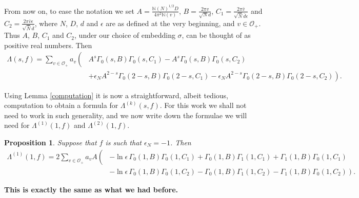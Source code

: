 \documentclass{article}
\theoremstyle{plain}
\newtheorem{proposition}{Proposition}
\begin{document}
From now on, to ease the notation we set $A=\frac{\mathbb{N}(N)^{1/2}D}{4\pi^2\mathbb{N}(v)}$, $B=\frac{2\pi v }{\sqrt{N}d}$, $C_1=\frac{2 \pi \bar{v}}{\sqrt{\bar{N}}\bar{d} \epsilon}$ and $C_2=\frac{2 \pi \bar{v}\epsilon}{\sqrt{\bar{N}}\bar{d} }$, where $N$, $D$, $d$ and $\epsilon$ are as defined at the very beginning, and $v \in \mathcal{O}_+$. Thus $A$, $B$, $C_1$ and $C_2$, under our choice of embedding $\sigma$, can be thought of as positive real numbers.
Then
\begin{equation}\label{simpleLambda}
\begin{split}
\Lambda(s,f)= \sum_{v \in \mathcal{O}_+} a_v \left( \right. &A^s \Gamma_0(s, B)\Gamma_0(s,C_1)  - A^s\Gamma_0(s,B)\Gamma_0(s,C_2)  \\
&+\left. \epsilon_N A^{2-s}\Gamma_0(2-s,B)\Gamma_0(2-s,C_1)-\epsilon_N A^{2-s}\Gamma_0(2-s,B)\Gamma_0(2-s,C_2) \right).
\end{split}
\end{equation}

Using Lemma \ref{computation} it is now a straightforward, albeit tedious, computation to obtain a formula for $\Lambda^{(k)}(s,f)$. For this work we shall not need to work in such generality, and we now write down the formulae we will need for $\Lambda^{(1)}(1,f)$ and $\Lambda^{(2)}(1,f)$.


\begin{proposition}
Suppose that $f$ is such that $\epsilon_N=-1$. Then
\begin{equation*}
\begin{split}
\Lambda^{(1)}(1,f)=  2 \sum_{v \in \mathcal{O}_+}  a_v A  \left( \right. & - \ln \epsilon \, \Gamma_0(1, B)\Gamma_0(1,C_1)+\Gamma_0(1,B)\Gamma_1(1,C_1)+\Gamma_1(1,B)\Gamma_0(1,C_1) \\
& - \left. \ln \epsilon \, \Gamma_0(1, B)\Gamma_0(1,C_2) - \Gamma_0(1,B)\Gamma_1(1,C_2) - \Gamma_1(1,B)\Gamma_0(1,C_2) \right).
\end{split}
\end{equation*}
\end{proposition}

\textbf{This is exactly the same as what we had before.}
\end{document}
